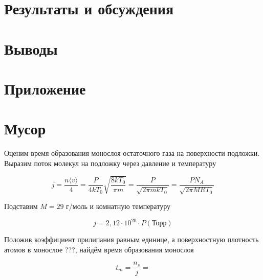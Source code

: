 \documentclass[a4paper, 14pt]{extarticle}
\begin{document}
	
	
	\section{Результаты и обсуждения}
	
	
	
	
	
	\section{Выводы}
	
	
	
	\section{Приложение}
	
	
	\section{Мусор}
	Оценим время образования монослоя остаточного газа на поверхности подложки. Выразим поток молекул на подложку через давление и температуру
	
	\begin{equation}
		j = \frac{n \langle v \rangle}{4} = \frac{P}{4kT_0} \sqrt{\frac{8kT_0}{\pi m}} = \frac{P}{\sqrt{2\pi mkT_0}} = \frac{PN_A}{\sqrt{2\pi MRT_0}}
	\end{equation}
	
	Подставим $M = 29$ г/моль и комнатную температуру
	
	\begin{equation}
		j = 2,12\cdot 10^{20} \cdot P(\text{Торр})
	\end{equation}
	
	Положив коэффициент прилипания равным единице, а поверхностную плотность атомов в монослое ???, найдём время образования монослоя
	
	\begin{equation}
		t_m = \frac{n_s}{j} = 
	\end{equation}
\end{document}
